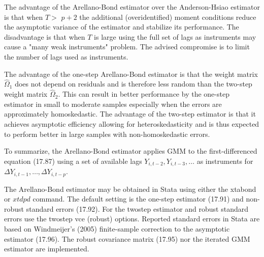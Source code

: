 \documentclass[10pt]{article}
\begin{document}
The advantage of the Arellano-Bond estimator over the Anderson-Hsiao estimator is that when $T>$ $p+2$ the additional (overidentified) moment conditions reduce the asymptotic variance of the estimator and stabilize its performance. The disadvantage is that when $T$ is large using the full set of lags as instruments may cause a "many weak instruments" problem. The advised compromise is to limit the number of lags used as instruments.

The advantage of the one-step Arellano-Bond estimator is that the weight matrix $\widehat{\Omega}_{1}$ does not depend on residuals and is therefore less random than the two-step weight matrix $\widehat{\Omega}_{2}$. This can result in better performance by the one-step estimator in small to moderate samples especially when the errors are approximately homoskedastic. The advantage of the two-step estimator is that it achieves asymptotic efficiency allowing for heteroskedasticity and is thus expected to perform better in large samples with non-homoskedastic errors.

To summarize, the Arellano-Bond estimator applies GMM to the first-differenced equation (17.87) using a set of available lags $Y_{i, t-2}, Y_{i, t-3}, \ldots$ as instruments for $\Delta Y_{i, t-1}, \ldots, \Delta Y_{i, t-p}$.

The Arellano-Bond estimator may be obtained in Stata using either the xtabond or $x t d p d$ command. The default setting is the one-step estimator (17.91) and non-robust standard errors (17.92). For the twostep estimator and robust standard errors use the twostep vce (robust) options. Reported standard errors in Stata are based on Windmeijer's (2005) finite-sample correction to the asymptotic estimator (17.96). The robust covariance matrix (17.95) nor the iterated GMM estimator are implemented.
\end{document}
